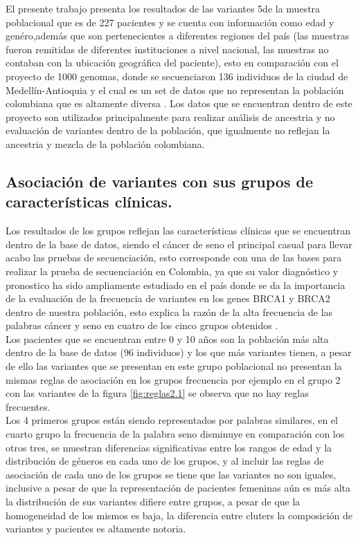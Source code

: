 El presente trabajo presenta los resultados de las variantes 5de la muestra poblacional que es de 227 pacientes y se cuenta con información como edad y genéro,además que son pertenecientes a diferentes regiones del país (las muestras fueron remitidas de diferentes instituciones a nivel nacional, las muestras no contaban con la ubicación geográfica del paciente), esto en comparación con el proyecto de 1000 genomas, donde se secuenciaron 136 individuos de la ciudad de Medellín-Antioquia y el cual es un set de datos que no representan la población colombiana que es altamente diversa \cite{GabrielBedoya,Consortium2012}. Los datos que se encuentran dentro de este proyecto son utilizados principalmente para realizar análisis de ancestria \cite{Rishishwar2015a} y no evaluación de variantes dentro de la población, que igualmente no reflejan la ancestria y mezcla de la población colombiana. 

\subsection{Asociación de variantes con sus grupos de características clínicas.}

Los resultados de los grupos reflejan las características clínicas que se encuentran dentro de la base de datos, siendo el cáncer de seno el principal casual para llevar acabo las pruebas de secuenciación, esto corresponde con una de las bases para realizar la prueba de secuenciación en Colombia, ya que su valor diagnóstico y pronostico ha sido ampliamente estudiado en el país donde se da la importancia de la evaluación de la frecuencia de variantes en los genes BRCA1 y BRCA2 dentro de nuestra población, esto explica la razón de la alta frecuencia de las palabras cáncer y seno en cuatro de los cinco grupos obtenidos \cite{Ignacio2017,Arias-blanco2015}.\\

Los pacientes que se encuentran entre 0 y 10 años son la población más alta dentro de la base de datos (96 individuos)  y los que más variantes tienen, a pesar de ello las variantes que se presentan en este grupo poblacional no presentan la mismas reglas de asociación en los grupos frecuencia por ejemplo en el grupo 2 con las variantes de la figura \ref{fig:reglas2.1} se observa que no hay reglas frecuentes.\\ 

Los 4 primeros grupos están siendo representados por palabras similares, en el cuarto grupo la frecuencia de la palabra seno disminuye en comparación con los otros tres, se muestran diferencias significativas entre los rangos de edad y la distribución de géneros en cada uno de los grupos, y al incluir las reglas de asociación de cada uno de los grupos se tiene que las variantes no son iguales, inclusive a pesar de que la representación de pacientes femeninas aún es más alta la distribución de sus variantes difiere entre grupos, a pesar de que la homogeneidad de los mismos es baja, la diferencia entre cluters la composición de variantes y pacientes es altamente notoria.\\  

